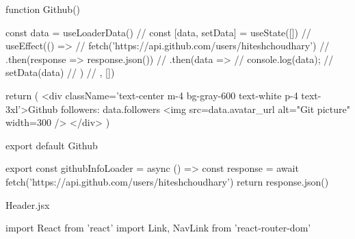                     function Github() {
                        const data = useLoaderData()
                        // const [data, setData] = useState([])
                        // useEffect(() => {
                        //  fetch('https://api.github.com/users/hiteshchoudhary')
                        //  .then(response => response.json())
                        //  .then(data => {
                        //     console.log(data);
                        //     setData(data)
                        //  })
                        // }, [])
                        
                    return (
                        <div className='text-center m-4 bg-gray-600 text-white p-4 text-3xl'>Github followers: {data.followers}
                        <img src={data.avatar_url} alt="Git picture" width={300} />
                        </div>
                    )
                    }

                    export default Github

                    export const githubInfoLoader = async () => {
                        const response = await fetch('https://api.github.com/users/hiteshchoudhary')
                        return response.json()
                    }

Header.jsx

                    import React from 'react'
                    import {Link, NavLink} from 'react-router-dom'

